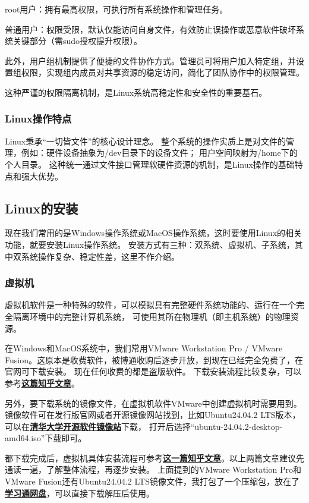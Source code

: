 root用户：拥有最高权限，可执行所有系统操作和管理任务。

普通用户：权限受限，默认仅能访问自身文件，有效防止误操作或恶意软件破坏系统关键部分（需sudo授权提升权限）。

此外，用户组机制提供了便捷的文件协作方式。管理员可将用户加入特定组，并设置组权限，实现组内成员对共享资源的稳定访问，简化了团队协作中的权限管理。

这种严谨的权限隔离机制，是Linux系统高稳定性和安全性的重要基石。

\subsubsection{Linux操作特点}
Linux秉承“一切皆文件”的核心设计理念。
整个系统的操作实质上是对文件的管理，例如：硬件设备抽象为/dev目录下的设备文件；
用户空间映射为/home下的个人目录。
这种统一通过文件接口管理软硬件资源的机制，是Linux操作的基础特点和强大优势。

\subsection{Linux的安装}
现在我们常用的是Windows操作系统或MacOS操作系统，这时要使用Linux的相关功能，就要安装Linux操作系统。
安装方式有三种：双系统、虚拟机、子系统，其中双系统操作复杂、稳定性差，这里不作介绍。
\subsubsection{虚拟机}
虚拟机软件是一种特殊的软件，可以模拟具有完整硬件系统功能的、运行在一个完全隔离环境中的完整计算机系统，
可使用其所在物理机（即主机系统）的物理资源。

在Windows和MacOS系统中，我们常用VMware Workstation Pro / VMware Fusion。这原本是收费软件，被博通收购后逐步开放，到现在已经完全免费了，在官网可下载安装。
现在任何收费的都是盗版软件。
下载安装流程比较复杂，可以参考\textbf{\textcolor{blue}{\href{https://zhuanlan.zhihu.com/p/1920914068174266797}{这篇知乎文章}}}。

另外，要下载系统的镜像文件，在虚拟机软件VMware中创建虚拟机时需要用到。镜像软件可在发行版官网或者开源镜像网站找到，比如Ubuntu24.04.2 LTS版本，
可以在\textbf{\textcolor{blue}{\href{https://mirrors.tuna.tsinghua.edu.cn/ubuntu-releases/24.04.2/}{清华大学开源软件镜像站}}}下载，
打开后选择“ubuntu-24.04.2-desktop-amd64.iso”下载即可。



都下载完成后，虚拟机具体安装流程可参考\textbf{\textcolor{blue}{\href{https://zhuanlan.zhihu.com/p/695848883}{这一篇知乎文章}}}。以上两篇文章建议先通读一遍，了解整体流程，再逐步安装。
上面提到的VMware Workstation Pro和VMware Fusion还有Ubuntu24.04.2 LTS镜像文件，我打包了一个压缩包，放在了\textbf{\textcolor{blue}{\href{https://pan-yz.cldisk.com/v2/external/resourceDetail.html?appid=2539F541-76D2-4949-9F18-52C967AE8F47&nonce=-1599050864&timestamp=1751472478787&showAppBar=true&autoPreview=true&objectId=84d105d7d634f408c7d7495fafa5f4e4&signature=3f032138382fbe50678d1ab207a8f92d}{学习通网盘}}}，可以直接下载解压后使用。

